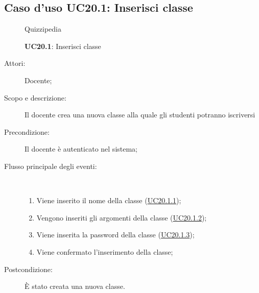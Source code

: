 \subsection{Caso d'uso UC20.1: Inserisci classe}
\begin{figure}[H]
	\centering
	\begin{resizedtikzpicture}{\textwidth}
		\begin{umlsystem}[x=0, fill=lightgray!20]{Quizzipedia}
		\end{umlsystem}
	\end{resizedtikzpicture}
	\caption{\textbf{UC20.1}: Inserisci classe}
	\label{UC20.1}
\end{figure}
\begin{description}
	\item[Attori:] Docente;
	\item[Scopo e descrizione:] Il docente crea una nuova classe alla quale gli studenti potranno iscriversi 
	\item[Precondizione:] Il docente è autenticato nel sistema;
	
	\item[Flusso principale degli eventi:] \ 
	\begin{enumerate}
		\item Viene inserito il nome della classe (\hyperlink{UC20.1.1}{UC20.1.1});
		\item Vengono inseriti gli argomenti della classe (\hyperlink{UC20.1.2}{UC20.1.2});
		\item Viene inserita la password della classe (\hyperlink{UC20.1.3}{UC20.1.3});
		\item Viene confermato l'inserimento della classe;
		
	\end{enumerate}
	\item[Postcondizione:] È stato creata una nuova classe.
\end{description}
\hypertarget{UC20.1.1}{}
